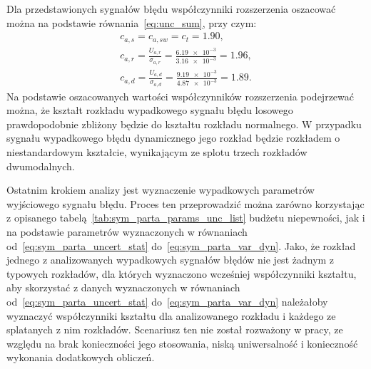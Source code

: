 Dla przedstawionych sygnałów błędu współczynniki rozszerzenia oszacować można na podstawie równania~\eqref{eq:unc_sum}, przy czym:
\begin{gather}
c_{a,s} = c_{a,sw} = c_{t} = 1.90 \label{eq:sym_parta_factor_sta}, \\
c_{a,r} = \frac{U_{a,r}}{\sigma_{a,r}} = \frac{\num{6.19e-3}}{\num{3.16e-3}} = 1.96 \label{eq:sym_parta_factor_rand}, \\
c_{a,d} = \frac{U_{a,d}}{\sigma_{a,d}} = \frac{\num{9.19e-3}}{\num{4.87e-3}} = 1.89 \label{eq:sym_parta_factor_dyn}.
\end{gather}
Na podstawie oszacowanych wartości współczynników rozszerzenia podejrzewać można, że kształt rozkładu wypadkowego sygnału błędu losowego prawdopodobnie zbliżony będzie do kształtu rozkładu normalnego. W przypadku sygnału wypadkowego błędu dynamicznego jego rozkład będzie rozkładem o niestandardowym kształcie, wynikającym ze splotu trzech rozkładów dwumodalnych.

Ostatnim krokiem analizy jest wyznaczenie wypadkowych parametrów wyjściowego sygnału błędu. Proces ten przeprowadzić można zarówno korzystając z opisanego tabelą~\ref{tab:sym_parta_params_unc_list} budżetu niepewności, jak i na podstawie parametrów wyznaczonych w równaniach od~\eqref{eq:sym_parta_uncert_stat} do~\eqref{eq:sym_parta_var_dyn}. Jako, że rozkład jednego z analizowanych wypadkowych sygnałów błędów nie jest żadnym z typowych rozkładów, dla których wyznaczono wcześniej współczynniki kształtu, aby skorzystać z danych wyznaczonych w równaniach od~\eqref{eq:sym_parta_uncert_stat} do~\eqref{eq:sym_parta_var_dyn} należałoby wyznaczyć współczynniki kształtu dla analizowanego rozkładu i każdego ze splatanych z nim rozkładów. Scenariusz ten nie został rozważony w pracy, ze względu na brak konieczności jego stosowania, niską uniwersalność i konieczność wykonania dodatkowych obliczeń.

